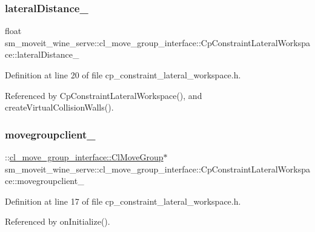 \subsubsection{\texorpdfstring{lateral\+Distance\+\_\+}{lateralDistance\_}}
{\footnotesize\ttfamily float sm\+\_\+moveit\+\_\+wine\+\_\+serve\+::cl\+\_\+move\+\_\+group\+\_\+interface\+::\+Cp\+Constraint\+Lateral\+Workspace\+::lateral\+Distance\+\_\+\hspace{0.3cm}{\ttfamily [private]}}



Definition at line 20 of file cp\+\_\+constraint\+\_\+lateral\+\_\+workspace.\+h.



Referenced by Cp\+Constraint\+Lateral\+Workspace(), and create\+Virtual\+Collision\+Walls().

\mbox{\label{classsm__moveit__wine__serve_1_1cl__move__group__interface_1_1CpConstraintLateralWorkspace_a5f0b2ff976bea0b0aeb83490ec66ae41}} 
\subsubsection{\texorpdfstring{movegroupclient\+\_\+}{movegroupclient\_}}
{\footnotesize\ttfamily \+::\hyperlink{classcl__move__group__interface_1_1ClMoveGroup}{cl\+\_\+move\+\_\+group\+\_\+interface\+::\+Cl\+Move\+Group}$\ast$ sm\+\_\+moveit\+\_\+wine\+\_\+serve\+::cl\+\_\+move\+\_\+group\+\_\+interface\+::\+Cp\+Constraint\+Lateral\+Workspace\+::movegroupclient\+\_\+\hspace{0.3cm}{\ttfamily [private]}}



Definition at line 17 of file cp\+\_\+constraint\+\_\+lateral\+\_\+workspace.\+h.



Referenced by on\+Initialize().

